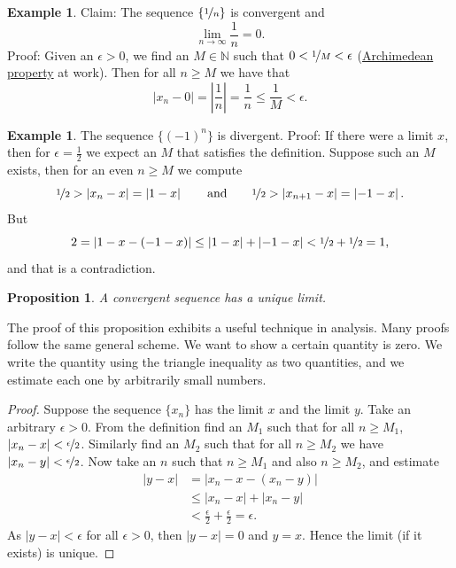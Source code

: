 \documentclass[12pt]{book}
\newcommand{\abs}[1]{\left\lvert {#1} \right\rvert}
\newcommand{\N}{{\mathbb{N}}}
\theoremstyle{plain}
\newtheorem{prop}[thm]{Proposition}
\theoremstyle{remark}
\theoremstyle{definition}
\theoremstyle{exercise}
\theoremstyle{example}
\newtheorem{example}[thm]{Example}
\begin{document}
\begin{example}
Claim: The sequence $\{ \nicefrac{1}{n} \}$ is convergent and
\begin{equation*}
\lim_{n\to \infty} \frac{1}{n} = 0 .
\end{equation*}
Proof: Given an $\epsilon > 0$, we find an $M \in \N$ such that
$0 < \nicefrac{1}{M} < \epsilon$
(\hyperref[thm:arch:i]{Archimedean property} at work).
Then for all $n \geq M$ we have that
\begin{equation*}
\abs{x_n - 0} = \abs{\frac{1}{n}} = \frac{1}{n} \leq \frac{1}{M} < \epsilon .
\end{equation*}
\end{example}

\begin{example}
The sequence $\{ {(-1)}^n \}$ is divergent.  Proof: If there
were a limit $x$, then for $\epsilon = \frac{1}{2}$ we expect an $M$ that
satisfies the definition.  Suppose
such an $M$ exists, then for an even $n \geq M$ we compute
\begin{equation*}
\nicefrac{1}{2} > \abs{x_n - x}  = \abs{1 - x}
\qquad \text{and} \qquad
\nicefrac{1}{2} > \abs{x_{n+1} - x}  = \abs{-1 - x} .
\end{equation*}
But
\begin{equation*}
2 = \abs{1 - x - (-1 -x)} \leq
\abs{1 - x} + \abs{-1 -x} < \nicefrac{1}{2} + \nicefrac{1}{2} = 1 ,
\end{equation*}
and that is a contradiction.
\end{example}

\begin{prop} \label{prop:limisunique}
A convergent sequence has a unique limit.
\end{prop}

The proof of this proposition exhibits a useful technique in
analysis.  Many proofs follow the same general scheme.  We want to
show a certain quantity is zero.  We write the quantity using the 
triangle inequality as two quantities, and we estimate each one
by arbitrarily small numbers.

\begin{proof}
Suppose the sequence $\{ x_n \}$ has the limit $x$ and the limit $y$.
Take an arbitrary $\epsilon > 0$.
From the definition find an $M_1$ such that for all $n \geq M_1$,
$\abs{x_n-x} < \nicefrac{\epsilon}{2}$.  Similarly find an $M_2$
such that for all $n \geq M_2$ we have
$\abs{x_n-y} < \nicefrac{\epsilon}{2}$.
Now take an $n$ such that $n \geq M_1$ and also $n \geq M_2$, and estimate
\begin{equation*}
\begin{split}
\abs{y-x}
& =
\abs{x_n-x - (x_n -y)} \\
& \leq
\abs{x_n-x} + \abs{x_n -y} \\
& <
\frac{\epsilon}{2} + \frac{\epsilon}{2} = \epsilon .
\end{split}
\end{equation*}
As $\abs{y-x} < \epsilon$ for all $\epsilon > 0$, then $\abs{y-x} = 0$
and $y=x$.  Hence the limit (if it exists) is unique.
\end{proof}
\end{document}
